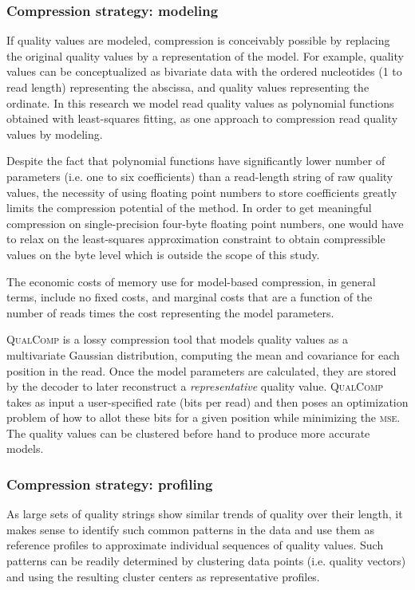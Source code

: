 \subsubsection{Compression strategy: modeling}

If quality values are modeled, compression is conceivably possible by
replacing the original quality values by a representation of the
model. For example, quality values can be conceptualized as bivariate
data with the ordered nucleotides (1 to read length) representing the
abscissa, and quality values representing the ordinate. In this
research we model read quality values as polynomial functions obtained
with least-squares fitting, as one approach to compression read
quality values by modeling.

Despite the fact that polynomial functions have significantly lower
number of parameters (i.e. one to six coefficients) than a read-length
string of raw quality values, the necessity of using floating point
numbers to store coefficients greatly limits the compression potential
of the method. In order to get meaningful compression on
single-precision four-byte floating point numbers, one would have to
relax on the least-squares approximation constraint to obtain
compressible values on the byte level which is outside the scope of
this study.

The economic costs of memory use for model-based compression, in
general terms, include no fixed costs, and marginal costs that are a
function of the number of reads times the cost representing the model
parameters.

\textsc{QualComp} is a lossy compression tool that models quality values as a multivariate Gaussian distribution, computing the mean and covariance for each position in the read\cite{Ochoa:2013rt}.
Once the model parameters are calculated, they are stored by the decoder to later reconstruct a \emph{representative} quality value.
\textsc{QualComp} takes as input a user-specified rate (bits per read) and then poses an optimization problem of how to allot these bits for a given position while minimizing the \textsc{mse}.
The quality values can be clustered before hand to produce more accurate models.

\subsubsection{Compression strategy: profiling}

As large sets of quality strings show similar trends of quality over
their length, it makes sense to identify such common patterns in the
data and use them as reference profiles to approximate individual
sequences of quality values. Such patterns can be readily determined by
clustering data points (i.e. quality vectors) and using the resulting
cluster centers as representative profiles.

